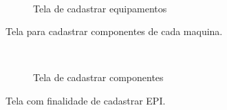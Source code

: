 \begin{figure}[H]
		\caption{\label{Cadastro_Equipamento_Sistema}Tela de cadastrar equipamentos}
	\centering
	\mbox{%
		\qquad
	}
	
\end{figure}
\newpage

Tela para cadastrar componentes de cada maquina.

\begin{figure}[H]
		\caption{\label{Cadastro_Componentes} Tela de cadastrar componentes}
	\centering
	\mbox{%
		\qquad
	}
	
\end{figure}
\newpage

Tela com finalidade de cadastrar EPI.

